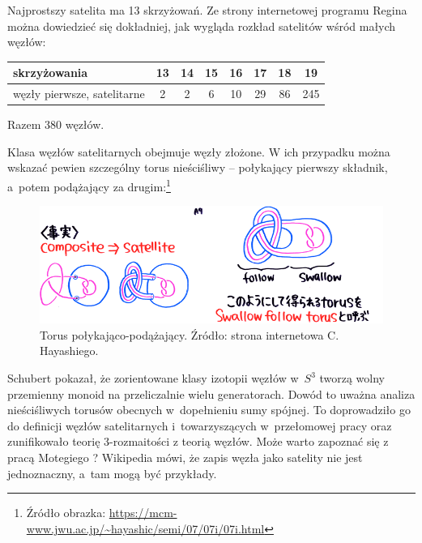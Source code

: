 Najprostszy satelita ma 13 skrzyżowań.
Ze strony internetowej programu Regina można dowiedzieć się dokładniej, jak wygląda rozkład satelitów wśród małych węzłów:

\renewcommand*{\arraystretch}{1.4}
\footnotesize
\begin{longtable}{lccccccc}
    \hline
    \textbf{skrzyżowania} & 13 & 14 & 15 & 16 & 17 & 18 & 19 \\ \hline \endhead
    węzły pierwsze, satelitarne & 2 & 2 & 6 & 10 & 29 & 86 & 245 \\
    \hline
\end{longtable}
\normalsize

Razem 380 węzłów.

\begin{example}
    Klasa węzłów satelitarnych obejmuje węzły złożone.
    W ich przypadku można wskazać pewien szczególny torus nieściśliwy -- połykający pierwszy składnik, a~potem podążający za drugim:\footnote{Źródło obrazka: \url{https://mcm-www.jwu.ac.jp/~hayashic/semi/07/07i/07i.html}}
    \begin{figure}[H]
        \centering
        \includegraphics[width=0.75\linewidth]{../data/mixed/follow-swallow.png}
        \caption[something]{Torus połykająco-podążający. Źródło: strona internetowa  C. Hayashiego.}
    \end{figure}
\end{example}

Schubert pokazał, że zorientowane klasy izotopii węzłów w~$S^3$ tworzą wolny przemienny monoid na przeliczalnie wielu generatorach.
%
Dowód to uważna analiza nieściśliwych torusów obecnych w~dopełnieniu sumy spójnej.
To doprowadziło go do definicji węzłów satelitarnych i~towarzyszących w~przełomowej pracy \cite{schubert53} oraz zunifikowało teorię 3-rozmaitości z teorią węzłów.
Może warto zapoznać się z pracą Motegiego \cite{motegi97}?
Wikipedia mówi, że zapis węzła jako satelity nie jest jednoznaczny, a~tam mogą być przykłady.


